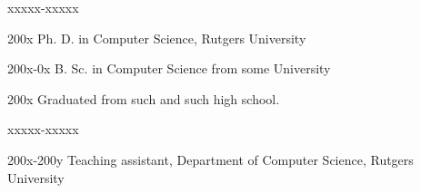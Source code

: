 \documentclass{ruthesis}
\begin{document}
\begin{vita}
 \vspace{15pt}
\begin{descriptionlist}{xxxxx-xxxxx} %
\item[200x] Ph. D. in Computer Science, Rutgers University
\item[200x-0x] B. Sc. in Computer Science from some University
\item[200x] Graduated from such and such high school.
\end{descriptionlist}
\medskip
\begin{descriptionlist}{xxxxx-xxxxx} %
\item[200x-200y] Teaching assistant, Department of Computer Science, Rutgers University
\end{descriptionlist}
\end{vita}
\end{document}
